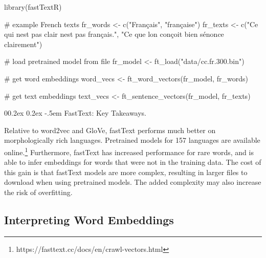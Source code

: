 \documentclass[
  man,
  floatsintext,
  longtable,
  nolmodern,
  notxfonts,
  notimes,
  colorlinks=true,linkcolor=blue,citecolor=blue,urlcolor=blue]{apa7}
\makeatletter
\renewcommand{\paragraph}{\@startsection{paragraph}{4}{\parindent}%
	{0\baselineskip \@plus 0.2ex \@minus 0.2ex}%
	{-.5em}%
	{\normalfont\normalsize\bfseries\typesectitle}}
\newenvironment{Shaded}{\begin{snugshade}}{\end{snugshade}}
\newcommand{\CommentTok}[1]{\textcolor[rgb]{0.37,0.37,0.37}{#1}}
\newcommand{\FunctionTok}[1]{\textcolor[rgb]{0.28,0.35,0.67}{#1}}
\newcommand{\NormalTok}[1]{\textcolor[rgb]{0.00,0.23,0.31}{#1}}
\newcommand{\OtherTok}[1]{\textcolor[rgb]{0.00,0.23,0.31}{#1}}
\newcommand{\StringTok}[1]{\textcolor[rgb]{0.13,0.47,0.30}{#1}}
\makeatother
\begin{document}
\begin{Shaded}
\begin{Highlighting}[]
\FunctionTok{library}\NormalTok{(fastTextR)}

\CommentTok{\# example French texts}
\NormalTok{fr\_words }\OtherTok{\textless{}{-}} \FunctionTok{c}\NormalTok{(}\StringTok{"Français"}\NormalTok{, }\StringTok{"française"}\NormalTok{)}
\NormalTok{fr\_texts }\OtherTok{\textless{}{-}} \FunctionTok{c}\NormalTok{(}\StringTok{"Ce qui n\textquotesingle{}est pas clair n\textquotesingle{}est pas français."}\NormalTok{, }
              \StringTok{"Ce que l\textquotesingle{}on conçoit bien s\textquotesingle{}énonce clairement"}\NormalTok{)}

\CommentTok{\# load pretrained model from file}
\NormalTok{fr\_model }\OtherTok{\textless{}{-}} \FunctionTok{ft\_load}\NormalTok{(}\StringTok{"data/cc.fr.300.bin"}\NormalTok{)}

\CommentTok{\# get word embeddings}
\NormalTok{word\_vecs }\OtherTok{\textless{}{-}} \FunctionTok{ft\_word\_vectors}\NormalTok{(fr\_model, fr\_words)}

\CommentTok{\# get text embeddings}
\NormalTok{text\_vecs }\OtherTok{\textless{}{-}} \FunctionTok{ft\_sentence\_vectors}\NormalTok{(fr\_model, fr\_texts)}
\end{Highlighting}
\end{Shaded}

\paragraph{FastText: Key Takeaways.}\label{fasttext-key-takeaways}

Relative to word2vec and GloVe, fastText performs much better on
morphologically rich languages. Pretrained models for 157 languages are
available online.\footnote{https://fasttext.cc/docs/en/crawl-vectors.html}
Furthermore, fastText has increased performance for rare words, and is
able to infer embeddings for words that were not in the training data.
The cost of this gain is that fastText models are more complex,
resulting in larger files to download when using pretrained models. The
added complexity may also increase the risk of overfitting.

\subsection{Interpreting Word
Embeddings}\label{interpreting-word-embeddings}
\end{document}
